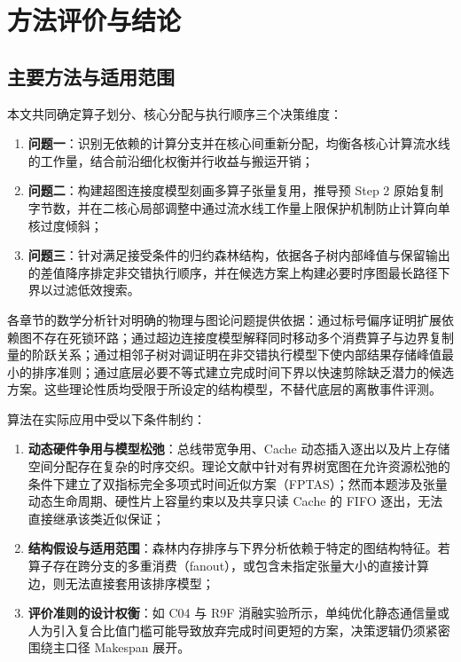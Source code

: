 \documentclass[anonymous,notoc]{gmcm2026}
\providecommand{\tightlist}{\setlength{\itemsep}{0pt}\setlength{\parskip}{0pt}}
\begin{document}
\section{方法评价与结论}

\subsection{主要方法与适用范围}

本文共同确定算子划分、核心分配与执行顺序三个决策维度：

\begin{enumerate}
\def\labelenumi{\arabic{enumi}.}
\tightlist
\item
  \textbf{问题一}：识别无依赖的计算分支并在核心间重新分配，均衡各核心计算流水线的工作量，结合前沿细化权衡并行收益与搬运开销；
\item
  \textbf{问题二}：构建超图连接度模型刻画多算子张量复用，推导预 Step 2 原始复制字节数，并在二核心局部调整中通过流水线工作量上限保护机制防止计算向单核过度倾斜；
\item
  \textbf{问题三}：针对满足接受条件的归约森林结构，依据各子树内部峰值与保留输出的差值降序排定非交错执行顺序，并在候选方案上构建必要时序图最长路径下界以过滤低效搜索。
\end{enumerate}

各章节的数学分析针对明确的物理与图论问题提供依据：通过标号偏序证明扩展依赖图不存在死锁环路；通过超边连接度模型解释同时移动多个消费算子与边界复制量的阶跃关系；通过相邻子树对调证明在非交错执行模型下使内部结果存储峰值最小的排序准则；通过底层必要不等式建立完成时间下界以快速剪除缺乏潜力的候选方案。这些理论性质均受限于所设定的结构模型，不替代底层的离散事件评测。

算法在实际应用中受以下条件制约：

\begin{enumerate}
\def\labelenumi{\arabic{enumi}.}
\tightlist
\item
  \textbf{动态硬件争用与模型松弛}：总线带宽争用、Cache 动态插入逐出以及片上存储空间分配存在复杂的时序交织。理论文献中针对有界树宽图在允许资源松弛的条件下建立了双指标完全多项式时间近似方案（FPTAS）\cite{ref11}；然而本题涉及张量动态生命周期、硬性片上容量约束以及共享只读 Cache 的 FIFO 逐出，无法直接继承该类近似保证；
\item
  \textbf{结构假设与适用范围}：森林内存排序与下界分析依赖于特定的图结构特征。若算子存在跨分支的多重消费（fanout），或包含未指定张量大小的直接计算边，则无法直接套用该排序模型；
\item
  \textbf{评价准则的设计权衡}：如 C04 与 R9F 消融实验所示，单纯优化静态通信量或人为引入复合比值门槛可能导致放弃完成时间更短的方案，决策逻辑仍须紧密围绕主口径 Makespan 展开。
\end{enumerate}
\end{document}
